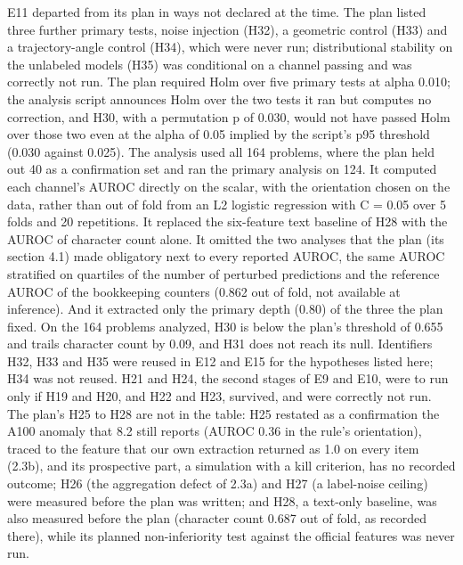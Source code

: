 E11 departed from its plan in ways not declared at the time. The plan listed three further primary tests, noise injection (H32), a geometric control (H33) and a trajectory-angle control (H34), which were never run; distributional stability on the unlabeled models (H35) was conditional on a channel passing and was correctly not run. The plan required Holm over five primary tests at alpha 0.010; the analysis script announces Holm over the two tests it ran but computes no correction, and H30, with a permutation p of 0.030, would not have passed Holm over those two even at the alpha of 0.05 implied by the script's p95 threshold (0.030 against 0.025). The analysis used all 164 problems, where the plan held out 40 as a confirmation set and ran the primary analysis on 124. It computed each channel's AUROC directly on the scalar, with the orientation chosen on the data, rather than out of fold from an L2 logistic regression with C = 0.05 over 5 folds and 20 repetitions. It replaced the six-feature text baseline of H28 with the AUROC of character count alone. It omitted the two analyses that the plan (its section 4.1) made obligatory next to every reported AUROC, the same AUROC stratified on quartiles of the number of perturbed predictions and the reference AUROC of the bookkeeping counters (0.862 out of fold, not available at inference). And it extracted only the primary depth (0.80) of the three the plan fixed. On the 164 problems analyzed, H30 is below the plan's threshold of 0.655 and trails character count by 0.09, and H31 does not reach its null. Identifiers H32, H33 and H35 were reused in E12 and E15 for the hypotheses listed here; H34 was not reused. H21 and H24, the second stages of E9 and E10, were to run only if H19 and H20, and H22 and H23, survived, and were correctly not run. The plan's H25 to H28 are not in the table: H25 restated as a confirmation the A100 anomaly that 8.2 still reports (AUROC 0.36 in the rule's orientation), traced to the feature that our own extraction returned as 1.0 on every item (2.3b), and its prospective part, a simulation with a kill criterion, has no recorded outcome; H26 (the aggregation defect of 2.3a) and H27 (a label-noise ceiling) were measured before the plan was written; and H28, a text-only baseline, was also measured before the plan (character count 0.687 out of fold, as recorded there), while its planned non-inferiority test against the official features was never run.

